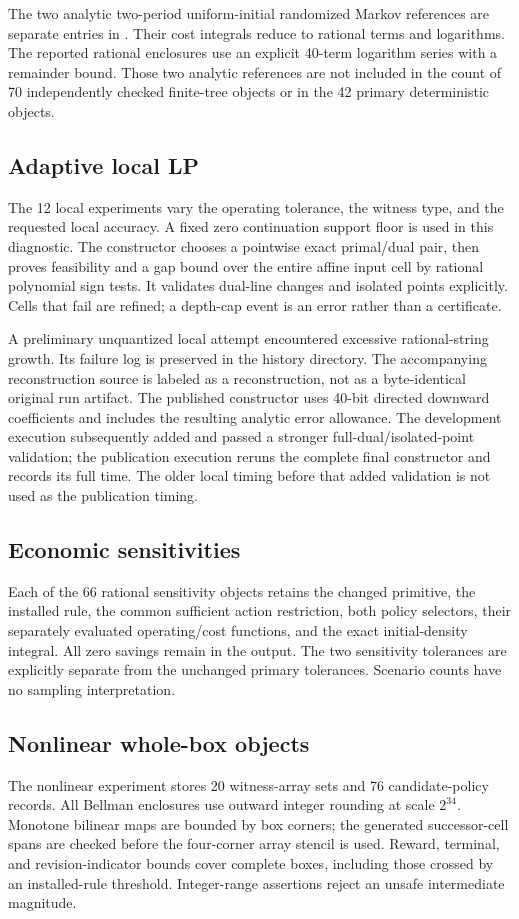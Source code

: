 The two analytic two-period uniform-initial randomized Markov references are separate entries in . Their cost integrals reduce to rational terms and logarithms. The reported rational enclosures use an explicit 40-term logarithm series with a remainder bound. Those two analytic references are not included in the count of 70 independently checked finite-tree objects or in the 42 primary deterministic objects.

\subsection{Adaptive local LP}
The 12 local experiments vary the operating tolerance, the witness type, and the requested local accuracy. A fixed zero continuation support floor is used in this diagnostic. The constructor chooses a pointwise exact primal/dual pair, then proves feasibility and a gap bound over the entire affine input cell by rational polynomial sign tests. It validates dual-line changes and isolated points explicitly. Cells that fail are refined; a depth-cap event is an error rather than a certificate.

A preliminary unquantized local attempt encountered excessive rational-string growth. Its failure log is preserved in the history directory. The accompanying reconstruction source is labeled as a reconstruction, not as a byte-identical original run artifact. The published constructor uses 40-bit directed downward coefficients and includes the resulting analytic error allowance. The development execution subsequently added and passed a stronger full-dual/isolated-point validation; the publication execution reruns the complete final constructor and records its full time. The older local timing before that added validation is not used as the publication timing.

\subsection{Economic sensitivities}
Each of the 66 rational sensitivity objects retains the changed primitive, the installed rule, the common sufficient action restriction, both policy selectors, their separately evaluated operating/cost functions, and the exact initial-density integral. All zero savings remain in the output. The two sensitivity tolerances are explicitly separate from the unchanged primary tolerances. Scenario counts have no sampling interpretation.

\subsection{Nonlinear whole-box objects}
The nonlinear experiment stores 20 witness-array sets and 76 candidate-policy records. All Bellman enclosures use outward integer rounding at scale $2^{34}$. Monotone bilinear maps are bounded by box corners; the generated successor-cell spans are checked before the four-corner array stencil is used. Reward, terminal, and revision-indicator bounds cover complete boxes, including those crossed by an installed-rule threshold. Integer-range assertions reject an unsafe intermediate magnitude.

